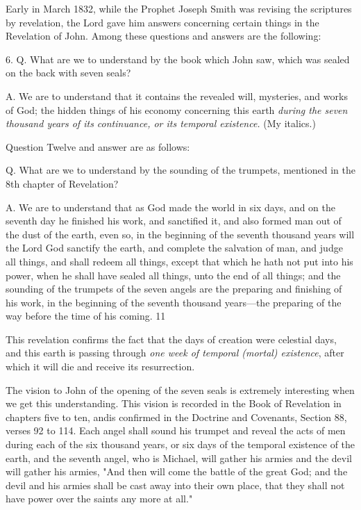 Early in March 1832, while the Prophet Joseph Smith was revising the scriptures by
revelation, the Lord gave him answers concerning certain things in the Revelation of John.
Among these questions and answers are the following:

6. Q. What are we to understand by the book which John saw, which was sealed on the back
with seven seals?

A. We are to understand that it contains the revealed will, mysteries, and works of God; the
hidden things of his economy concerning this earth \textit{during the seven thousand years of its
continuance, or its temporal existence.} (My italics.)

Question Twelve and answer are as follows:

Q. What are we to understand by the sounding of the trumpets, mentioned in the 8th chapter
of Revelation?

A. We are to understand that as God made the world in six days, and on the seventh day he
finished his work, and sanctified it, and also formed man out of the dust of the earth, even so,
in the beginning of the seventh thousand years will the Lord God sanctify the earth, and
complete the salvation of man, and judge all things, and shall redeem all things, except that
which he hath not put into his power, when he shall have sealed all things, unto the end of all
things; and the sounding of the trumpets of the seven angels are the preparing and finishing
of his work, in the beginning of the seventh thousand years—the preparing of the way before
the time of his coming. 11

This revelation confirms the fact that the days of creation were celestial days, and this earth
is passing through \textit{one week of temporal (mortal) existence}, after which it will die and
receive its resurrection.

The vision to John of the opening of the seven seals is extremely interesting when we get this
understanding. This vision is recorded in the Book of Revelation in chapters five to ten, andis confirmed in the Doctrine and Covenants, Section 88, verses 92 to 114. Each angel shall
sound his trumpet and reveal the acts of men during each of the six thousand years, or six
days of the temporal existence of the earth, and the seventh angel, who is Michael, will
gather his armies and the devil will gather his armies, "And then will come the battle of the
great God; and the devil and his armies shall be cast away into their own place, that they
shall not have power over the saints any more at all."

